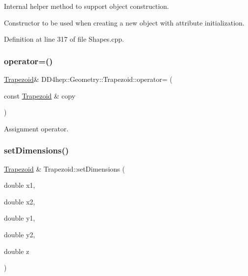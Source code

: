 Internal helper method to support object construction. 

Constructor to be used when creating a new object with attribute initialization. 

Definition at line 317 of file Shapes.\+cpp.

\hypertarget{class_d_d4hep_1_1_geometry_1_1_trapezoid_a3313c5ca5dda01ef715981a44752ecf6}{}\label{class_d_d4hep_1_1_geometry_1_1_trapezoid_a3313c5ca5dda01ef715981a44752ecf6} 
\subsubsection{\texorpdfstring{operator=()}{operator=()}}
{\footnotesize\ttfamily \hyperlink{class_d_d4hep_1_1_geometry_1_1_trapezoid}{Trapezoid}\& D\+D4hep\+::\+Geometry\+::\+Trapezoid\+::operator= (\begin{DoxyParamCaption}\item[{const \hyperlink{class_d_d4hep_1_1_geometry_1_1_trapezoid}{Trapezoid} \&}]{copy }\end{DoxyParamCaption})\hspace{0.3cm}{\ttfamily [default]}}



Assignment operator. 

\hypertarget{class_d_d4hep_1_1_geometry_1_1_trapezoid_ad36a96cf7a7fbcd3145ca664e2c8fa39}{}\label{class_d_d4hep_1_1_geometry_1_1_trapezoid_ad36a96cf7a7fbcd3145ca664e2c8fa39} 
\subsubsection{\texorpdfstring{set\+Dimensions()}{setDimensions()}}
{\footnotesize\ttfamily \hyperlink{class_d_d4hep_1_1_geometry_1_1_trapezoid}{Trapezoid} \& Trapezoid\+::set\+Dimensions (\begin{DoxyParamCaption}\item[{double}]{x1,  }\item[{double}]{x2,  }\item[{double}]{y1,  }\item[{double}]{y2,  }\item[{double}]{z }\end{DoxyParamCaption})}




